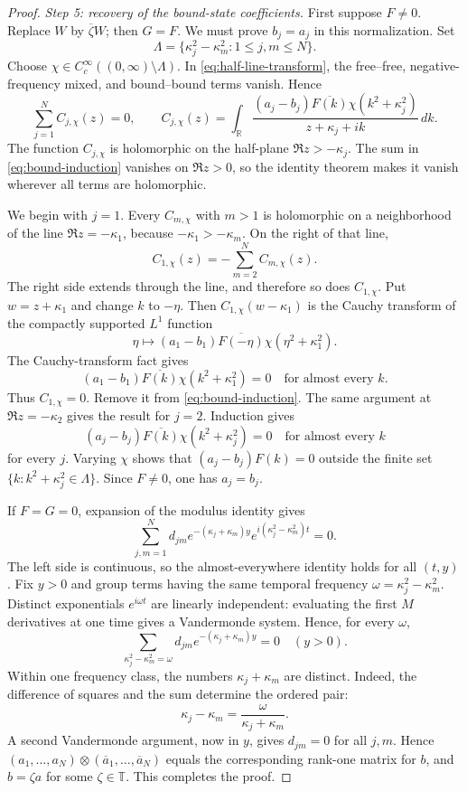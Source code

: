 \documentclass[11pt]{amsart}
\numberwithin{equation}{section}
\theoremstyle{remark}
\newcommand{\R}{\mathbb R}
\newcommand{\T}{\mathbb T}
\begin{document}
\begin{proof}
\emph{Step 5: recovery of the bound-state coefficients.}
First suppose $F\ne0$.  Replace $W$
by $\overline\zeta W$; then $G=F$.  We must prove $b_j=a_j$ in this
normalization.  Set
\[
 \Lambda=\{\kappa_j^2-\kappa_m^2:1\le j,m\le N\}.
\]
Choose $\chi\in C_c^\infty((0,\infty)\setminus\Lambda)$.  In
\eqref{eq:half-line-transform}, the free--free, negative-frequency mixed, and
bound--bound terms vanish.  Hence
\begin{equation}
 \sum_{j=1}^N C_{j,\chi}(z)=0,
 \qquad
 C_{j,\chi}(z)=\int_\R
 \frac{(a_j-b_j)\overline{F(k)}\chi(k^2+\kappa_j^2)}
      {z+\kappa_j+ik}\,dk.
 \label{eq:bound-induction}
\end{equation}
The function $C_{j,\chi}$ is holomorphic on the half-plane
$\Re z>-\kappa_j$.  The sum in \eqref{eq:bound-induction} vanishes on
$\Re z>0$, so the identity theorem makes it vanish wherever all terms are
holomorphic.

We begin with $j=1$.  Every $C_{m,\chi}$ with $m>1$ is holomorphic on a
neighborhood of the line $\Re z=-\kappa_1$, because
$-\kappa_1>-\kappa_m$.  On the right of that line,
\[
 C_{1,\chi}(z)=-\sum_{m=2}^N C_{m,\chi}(z).
\]
The right side extends through the line, and therefore so does
$C_{1,\chi}$.  Put $w=z+\kappa_1$ and change $k$ to $-\eta$.  Then
$C_{1,\chi}(w-\kappa_1)$ is the Cauchy transform of the compactly supported
$L^1$ function
\[
 \eta\longmapsto
 (a_1-b_1)\overline{F(-\eta)}
 \chi(\eta^2+\kappa_1^2).
\]
The Cauchy-transform fact gives
\[
 (a_1-b_1)\overline{F(k)}\chi(k^2+\kappa_1^2)=0
 \quad\text{for almost every }k.
\]
Thus $C_{1,\chi}=0$.  Remove it from \eqref{eq:bound-induction}.  The same
argument at $\Re z=-\kappa_2$ gives the result for $j=2$.  Induction gives
\[
 (a_j-b_j)\overline{F(k)}\chi(k^2+\kappa_j^2)=0
 \quad\text{for almost every }k
\]
for every $j$.  Varying $\chi$ shows that
$(a_j-b_j)F(k)=0$ outside the finite set
$\{k:k^2+\kappa_j^2\in\Lambda\}$.  Since $F\ne0$, one has $a_j=b_j$.

If $F=G=0$, expansion of the modulus identity gives
\[
 \sum_{j,m=1}^N d_{jm}e^{-(\kappa_j+\kappa_m)y}
 e^{i(\kappa_j^2-\kappa_m^2)t}=0.
\]
The left side is continuous, so the almost-everywhere identity holds for all
$(t,y)$.  Fix $y>0$ and group terms having the same temporal frequency
$\omega=\kappa_j^2-\kappa_m^2$.  Distinct exponentials $e^{i\omega t}$ are
linearly independent: evaluating the first $M$ derivatives at one time gives
a Vandermonde system.  Hence, for every $\omega$,
\[
 \sum_{\kappa_j^2-\kappa_m^2=\omega}
 d_{jm}e^{-(\kappa_j+\kappa_m)y}=0
 \quad(y>0).
\]
Within one frequency class, the numbers $\kappa_j+\kappa_m$ are distinct.
Indeed, the difference of squares and the sum determine the ordered pair:
\[
 \kappa_j-\kappa_m=
 \frac{\omega}{\kappa_j+\kappa_m}.
\]
A second Vandermonde argument, now in $y$, gives $d_{jm}=0$ for all $j,m$.  Hence
$(a_1,\ldots,a_N)\otimes(\overline a_1,\ldots,\overline a_N)$ equals the
corresponding rank-one matrix for $b$, and $b=\zeta a$ for some $\zeta\in\T$.
This completes the proof.
\end{proof}
\end{document}
